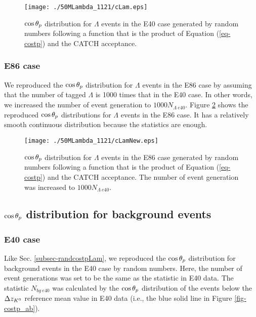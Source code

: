 \begin{figure}[h]
  \centering
  \texttt{[image: ./50MLambda\_1121/cLam.eps]}
  \caption{$\cos{\theta_p}$ distribution for $\Lambda$ events in the E40 case generated by random numbers following a function that is the product of Equation (\ref{eq-costp}) and the CATCH acceptance. %
  }
  \label{fig-cLam}
\end{figure}

\subsubsection{E86 case}
We reproduced the $\cos{\theta_p}$ distribution for $\Lambda$ events in the E86 case by assuming that the number of tagged $\Lambda$ is 1000 times that in the E40 case. In other words, we increased the number of event generation to $1000 N_{\Lambda\ e40}$. Figure \ref{fig-cLamNew} shows the reproduced $\cos{\theta_p}$ distributions for $\Lambda$ events in the E86 case. It has a relatively smooth continuous distribution because the statistics are enough.

\begin{figure}[h]
  \centering
  \texttt{[image: ./50MLambda\_1121/cLamNew.eps]}
  \caption{$\cos{\theta_p}$ distribution for $\Lambda$ events in the E86 case generated by random numbers following a function that is the product of Equation (\ref{eq-costp}) and the CATCH acceptance. The number of event generation was increased to $1000 N_{\Lambda\ e40}$.}
  \label{fig-cLamNew}
\end{figure}


\subsection{$\cos{\theta_p}$ distribution for background events}
\label{subsec-randcostpBG}
\subsubsection{E40 case}
Like Sec. \ref{subsec-randcostpLam}, we reproduced the $\cos{\theta_p}$ distribution for background events in the E40 case by random numbers. Here, the number of event generations was set to be the same as the statistic in E40 data. The statistic $N_{bg\ e40}$ was calculated by the $\cos{\theta_p}$ distribution of the events below the $\Delta z_{K^{0}}$ reference mean value in E40 data (i.e., the blue solid line in Figure \ref{fig-costp_ab}). 

